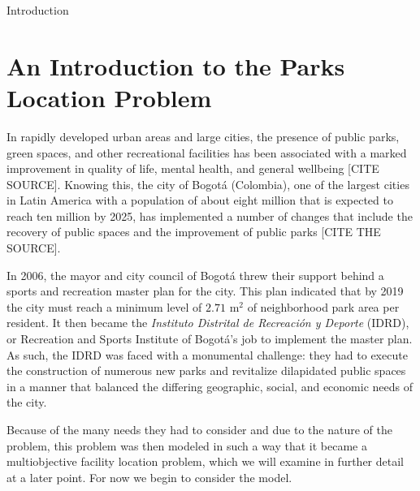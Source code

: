 \documentclass[12pt]{pom_thesis}
\begin{document}
\begin{chapter}{Introduction}
\section{An Introduction to the Parks Location Problem}

	In rapidly developed urban areas and large cities, the presence of public parks, green spaces, and other recreational facilities has been associated with a marked improvement in quality of life, mental health, and general wellbeing [CITE SOURCE]. Knowing this, the city of Bogot\'{a} (Colombia), one of the largest cities in Latin America with a population of about eight million that is expected to reach ten million by 2025, has implemented a number of changes that include the recovery of public spaces and the improvement of public parks [CITE THE SOURCE]. 
	
	In 2006, the mayor and city council of Bogot\'{a} threw their support behind a sports and recreation master plan for the city. This plan indicated that by 2019 the city must reach a minimum level of $2.71$  $\textrm{m}^2$ of neighborhood park area per resident. It then became the \textit{Instituto Distrital de Recreaci\'{o}n y Deporte} (IDRD), or Recreation and Sports Institute of Bogot\'{a}'s job to implement the master plan. As such, the IDRD was faced with a monumental challenge: they had to execute the construction of numerous new parks and revitalize dilapidated public spaces in a manner that balanced the differing geographic, social, and economic needs of the city. 
	
	Because of the many needs they had to consider and due to the nature of the problem, this problem was then modeled in such a way that it became a multiobjective facility location problem, which we will examine in further detail at a later point. For now we begin to consider the model.
\end{chapter}
\end{document}
